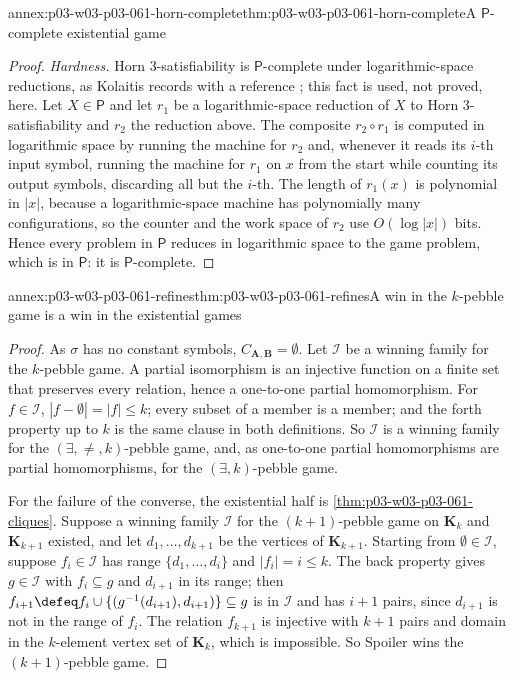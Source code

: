 \begin{annexitem}{annex:p03-w03-p03-061-horn-complete}{thm:p03-w03-p03-061-horn-complete}{A \(\mathsf P\)-complete existential game}
\begin{proof}
\emph{Hardness.} Horn 3-satisfiability is \(\mathsf P\)-complete under
logarithmic-space reductions, as Kolaitis records with a reference
\cite[p.~76]{Kolaitis2003ExpressivePowerNotes}; this fact is used, not proved,
here. Let \(X\in\mathsf P\) and let \(r_1\) be a logarithmic-space reduction
of \(X\) to Horn 3-satisfiability and \(r_2\) the reduction above. The
composite \(r_2\circ r_1\) is computed in logarithmic space by running the
machine for \(r_2\) and, whenever it reads its \(i\)-th input symbol,
running the machine for \(r_1\) on \(x\) from the start while counting its
output symbols, discarding all but the \(i\)-th. The length of \(r_1(x)\) is
polynomial in \(|x|\), because a logarithmic-space machine has polynomially
many configurations, so the counter and the work space of \(r_2\) use
\(O(\log|x|)\) bits. Hence every problem in \(\mathsf P\) reduces in
logarithmic space to the game problem, which is in \(\mathsf P\): it is
\(\mathsf P\)-complete.
\end{proof}
\end{annexitem}

\begin{annexitem}{annex:p03-w03-p03-061-refines}{thm:p03-w03-p03-061-refines}{A win in the \(k\)-pebble game is a win in the existential games}
\begin{proof}
As \(\sigma\) has no constant symbols, \(C_{\mathbf A,\mathbf B}=\emptyset\).
Let \(\mathcal I\) be a winning family for the \(k\)-pebble game. A partial
isomorphism is an injective function on a finite set that preserves every
relation, hence a one-to-one partial homomorphism. For \(f\in\mathcal I\),
\(|f-\emptyset|=|f|\le k\); every subset of a member is a member; and the forth
property up to \(k\) is the same clause in both definitions. So \(\mathcal I\)
is a winning family for the \((\exists,\neq,k)\)-pebble game, and, as
one-to-one partial homomorphisms are partial homomorphisms, for the
\((\exists,k)\)-pebble game.

For the failure of the converse, the existential half is
\cref{thm:p03-w03-p03-061-cliques}. Suppose a winning family \(\mathcal I\)
for the \((k+1)\)-pebble game on \(\mathbf K_k\) and \(\mathbf K_{k+1}\)
existed, and let \(d_1,\ldots,d_{k+1}\) be the vertices of
\(\mathbf K_{k+1}\). Starting from \(\emptyset\in\mathcal I\), suppose
\(f_i\in\mathcal I\) has range \(\{d_1,\ldots,d_i\}\) and \(|f_i|=i\le k\).
The back property gives \(g\in\mathcal I\) with \(f_i\subseteq g\) and
\(d_{i+1}\) in its range; then \(f_{i+1}\defeq f_i\cup\{(g^{-1}(d_{i+1}),
d_{i+1})\}\subseteq g\) is in \(\mathcal I\) and has \(i+1\) pairs, since
\(d_{i+1}\) is not in the range of \(f_i\). The relation \(f_{k+1}\) is
injective with \(k+1\) pairs and domain in the \(k\)-element vertex set of
\(\mathbf K_k\), which is impossible. So Spoiler wins the
\((k+1)\)-pebble game.
\end{proof}
\end{annexitem}

